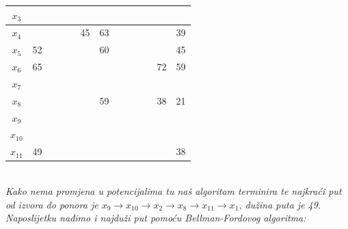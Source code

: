 \documentclass[12pt]{article}
\begin{document}
\begin{enumerate}
\begin{center}
{\begin{tabular}{|c|c|c|c|c|c|c|c|c|c|c|c|c|}
$x_3$ &  &  &  &  &  &  &  &  &  &  &  &  \\ \hline
$x_4$ &  &  &  &  & 45 & 63 &  &  &  &  &  & 39 \\ \hline
$x_5$ & 52 &  &  &  &  & 60 &  &  &  &  &  & 45 \\ \hline
$x_6$ & 65 &  &  &  &  &  &  &  &  &  & 72 & 59 \\ \hline
$x_7$ &  &  &  &  &  &  &  &  &  &  &  &  \\ \hline
$x_8$ &  &  &  &  &  & 59 &  &  &  &  & 38 & 21 \\ \hline
$x_9$ &  &  & \textbf{} &  &  &  & \textbf{} &  &  & \textbf{} &  &  \\ \hline
$x_{10}$ &  &  &  &  &  &  &  &  &  &  &  &  \\ \hline
$x_{11}$ & 49 &  &  &  &  &  &  &  &  &  &  & 38 \\ \hline
\end{tabular}%
      }\\
      
       \vspace{0.5cm}
      \textit{Kako nema promjena u potencijalima tu naš algoritam terminira te najkraći put od izvora do ponora je $x_9 \rightarrow x_{10}  \rightarrow x_2 \rightarrow x_8\rightarrow x_{11} \rightarrow x_1$, dužina puta je 49. }\\
     \vspace{0.3cm}
      \textit{Naposlijetku nađimo i najduži put pomoću Bellman-Fordovog algoritma:}\\
      

\end{center}
\end{enumerate}
\end{document}
